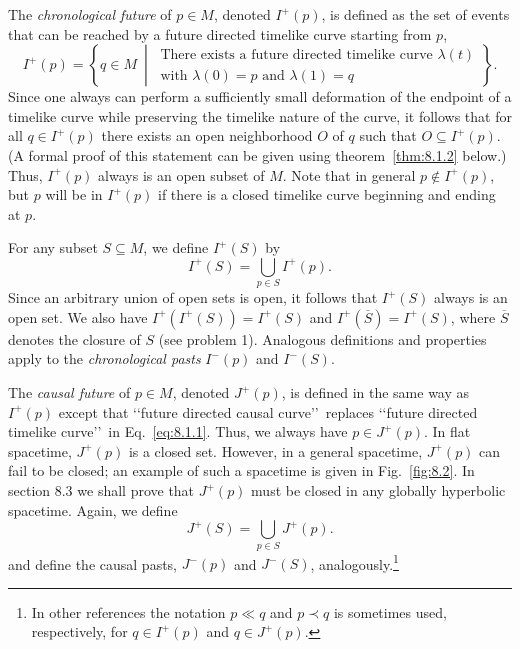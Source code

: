 The \emph{chronological future} of \(p\in M\), denoted \(I^+(p)\), is defined as the
set of events that can be reached by a future directed timelike curve starting from
\(p\),
\begin{equation}
  I^+(p)=\left\{q\in M\ \middle|\ \begin{gathered}
    \text{There exists a future directed timelike curve }\lambda(t)\\
    \text{with }\lambda(0)=p\text{ and }\lambda(1)=q
  \end{gathered}\right\}.
  \tag{8.1.1}\label{eq:8.1.1}
\end{equation}
Since one always can perform a sufficiently small deformation of the endpoint of a
timelike curve while preserving the timelike nature of the curve, it follows that for
all \(q\in I^+(p)\) there exists an open neighborhood \(O\) of \(q\) such that
\(O\subseteq I^+(p)\). (A formal proof of this statement can be given using
theorem~\ref{thm:8.1.2} below.) Thus, \(I^+(p)\) always is an open subset of \(M\).
Note that in general \(p\notin I^+(p)\), but \(p\) will be in \(I^+(p)\) if there is
a closed timelike curve beginning and ending at \(p\).

For any subset \(S\subseteq M\), we define \(I^+(S)\) by
\begin{equation}
  I^+(S)=\bigcup_{p\in S}I^+(p).
  \tag{8.1.2}\label{eq:8.1.2}
\end{equation}
Since an arbitrary union of open sets is open, it follows that \(I^+(S)\) always is
an open set. We also have \(I^+(I^+(S))=I^+(S)\) and
\(I^+(\overline S)=I^+(S)\), where \(\overline S\) denotes the closure of \(S\)
(see problem 1). Analogous definitions and properties apply to the
\emph{chronological pasts} \(I^-(p)\) and \(I^-(S)\).

The \emph{causal future} of \(p\in M\), denoted \(J^+(p)\), is defined in the same
way as \(I^+(p)\) except that \lq\lq future directed causal curve\rq\rq\ replaces \lq\lq future
directed timelike curve\rq\rq\ in Eq.~\eqref{eq:8.1.1}. Thus, we always have
\(p\in J^+(p)\). In flat spacetime, \(J^+(p)\) is a closed set. However, in a
general spacetime, \(J^+(p)\) can fail to be closed; an example of such a spacetime
is given in Fig.~\ref{fig:8.2}. In section 8.3 we shall prove that \(J^+(p)\) must be
closed in any globally hyperbolic spacetime. Again, we define
\begin{equation}
  J^+(S)=\bigcup_{p\in S}J^+(p).
  \tag{8.1.3}\label{eq:8.1.3}
\end{equation}
and define the causal pasts, \(J^-(p)\) and \(J^-(S)\), analogously.\footnote{In
other references the notation \(p\ll q\) and \(p\prec q\) is sometimes used,
respectively, for \(q\in I^+(p)\) and \(q\in J^+(p)\).}

